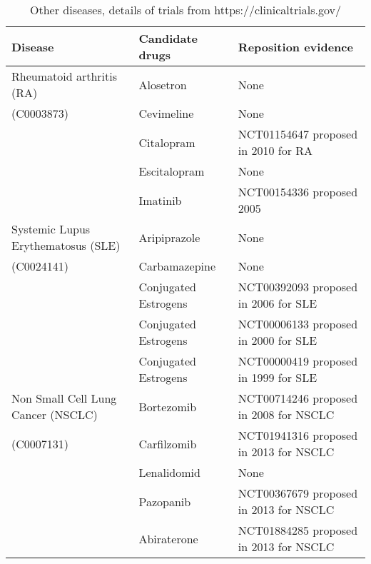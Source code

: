 \documentclass[preprint,11pt]{elsarticle}
\begin{document}
\begin{table}[h]
\centering \caption{Other diseases, details of trials from https://clinicaltrials.gov/}\label{theothers}
\scriptsize
\begin{tabular}{lll}
  \hline
 Disease &   Candidate drugs &  Reposition evidence\\ 
 \hline
 Rheumatoid arthritis (RA) & Alosetron  & None  \\
 (C0003873)               & Cevimeline & None\\
                                 & Citalopram & NCT01154647 proposed in 2010 for RA \\
                                 & Escitalopram & None\\
                                 & Imatinib & NCT00154336 proposed 2005\\ 
 \hline
Systemic Lupus Erythematosus (SLE) & Aripiprazole & None\\
(C0024141)                                       & Carbamazepine & None \\
                                                           &  Conjugated Estrogens & NCT00392093 proposed in 2006 for SLE\\
                                                         &  Conjugated Estrogens & NCT00006133 proposed in 2000 for SLE\\
                                                        &  Conjugated Estrogens & NCT00000419 proposed in 1999 for SLE\\
 \hline
Non Small Cell Lung Cancer (NSCLC)  & Bortezomib & NCT00714246 proposed in 2008 for NSCLC\\                                                      
(C0007131)                                       & Carfilzomib &  NCT01941316 proposed in 2013 for NSCLC\\
                                                        &  Lenalidomid  & None \\
                                                        & Pazopanib & NCT00367679 proposed in 2013 for NSCLC \\
                                                        & Abiraterone &NCT01884285 proposed in 2013 for NSCLC\\
 \hline
\end{tabular}
\end{table}
\normalsize
  
\end{document}
